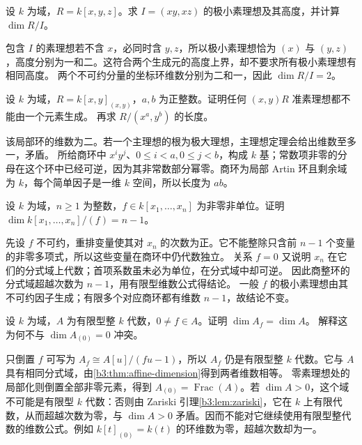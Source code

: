 \begin{exercise}\label{b3:ex:09-height-components}
	设 \(k\) 为域，\(R=k[x,y,z]\)。求 \(I=(xy,xz)\) 的极小素理想及其高度，并计算 \(\dim R/I\)。
\end{exercise}
\begin{solution}
	包含 \(I\) 的素理想若不含 \(x\)，必同时含 \(y,z\)，所以极小素理想恰为 \((x)\) 与 \((y,z)\)，高度分别为一和二。这符合两个生成元的高度上界，却不要求所有极小素理想有相同高度。 两个不可约分量的坐标环维数分别为二和一，因此 \(\dim R/I=2\)。
\end{solution}

\begin{exercise}\label{b3:ex:09-primary-generators}
	设 \(k\) 为域，\(R=k[x,y]_{(x,y)}\)，\(a,b\) 为正整数。证明任何 \((x,y)R\) 准素理想都不能由一个元素生成。 再求 \(R/(x^a,y^b)\) 的长度。
\end{exercise}
\begin{solution}
	该局部环的维数为二。若一个主理想的根为极大理想，主理想定理会给出维数至多一，矛盾。 所给商环中 \(x^iy^j\)、\(0\le i<a,0\le j<b\)，构成 \(k\) 基；常数项非零的分母在这个环中已经可逆，因为其非常数部分幂零。商环为局部 Artin 环且剩余域为 \(k\)，每个简单因子是一维 \(k\) 空间，所以长度为 \(ab\)。
\end{solution}

\begin{exercise}\label{b3:ex:09-hypersurface-dimension}
	设 \(k\) 为域，\(n\ge1\) 为整数，\(f\in k[x_1,\ldots,x_n]\) 为非零非单位。证明 \(\dim k[x_1,\ldots,x_n]/(f)=n-1\)。
\end{exercise}
\begin{solution}
	先设 \(f\) 不可约，重排变量使其对 \(x_n\) 的次数为正。它不能整除只含前 \(n-1\) 个变量的非零多项式，所以这些变量在商环中仍代数独立。 关系 \(f=0\) 又说明 \(x_n\) 在它们的分式域上代数；首项系数虽未必为单位，在分式域中却可逆。 因此商整环的分式域超越次数为 \(n-1\)，用有限型维数公式得结论。 一般 \(f\) 的极小素理想由其不可约因子生成；有限多个对应商环都有维数 \(n-1\)，故结论不变。
\end{solution}

\begin{exercise}\label{b3:ex:09-open-dimension}
	设 \(k\) 为域，\(A\) 为有限型整 \(k\) 代数，\(0\ne f\in A\)。证明 \(\dim A_f=\dim A\)。 解释这为何不与 \(\dim A_{(0)}=0\) 冲突。
\end{exercise}
\begin{solution}
	只倒置 \(f\) 可写为 \(A_f\cong A[u]/(fu-1)\)，所以 \(A_f\) 仍是有限型整 \(k\) 代数。它与 \(A\) 具有相同分式域，由\cref{b3:thm:affine-dimension}得到两者维数相等。 零素理想处的局部化则倒置全部非零元素，得到 \(A_{(0)}=\operatorname{Frac}(A)\)。若 \(\dim A>0\)，这个域不可能是有限型 \(k\) 代数：否则由 Zariski 引理\cref{b3:lem:zariski}，它在 \(k\) 上有限代数，从而超越次数为零，与 \(\dim A>0\) 矛盾。因而不能对它继续使用有限型整代数的维数公式。例如 \(k[t]_{(0)}=k(t)\) 的环维数为零，超越次数却为一。
\end{solution}

